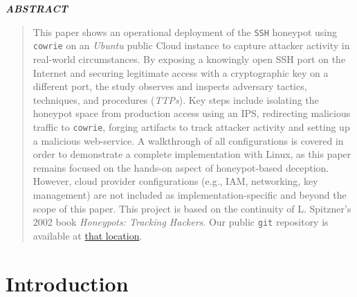 \documentclass{cls/ULBreport}
\renewenvironment{abstract}{%
  \clearpage
  \thispagestyle{plain}
  \begin{center}
    \bfseries\itshape ABSTRACT
  \end{center}
  \vspace{0.5cm}
  \begin{quote}
    \itshape
    \justifying
}{%
  \end{quote}
  \clearpage
}
\begin{document}
    
    \renewcommand{\rmdefault}{cmr} %
    \renewcommand{\sfdefault}{cmss} %
    \renewcommand{\ttdefault}{cmtt} %
    
    \makeatletter
    \renewcommand{\reset@font}{\normalfont\@setfontsize\f@size{12}{14.4}}
    \makeatother
    \normalfont


    \begin{abstract}        
    This paper shows an operational deployment of the \texttt{SSH} honeypot using \texttt{cowrie} on an \textit{Ubuntu} public Cloud instance to capture attacker activity in real-world circumstances. By exposing a knowingly open SSH port on the Internet and securing legitimate access with a cryptographic key on a different port, the study observes and inspects adversary tactics, techniques, and procedures (\textit{TTPs}). Key steps include isolating the honeypot space from production access using an IPS, redirecting malicious traffic to \texttt{cowrie}, forging artifacts to track attacker activity and setting up a malicious web-service. A walkthrough of all configurations is covered in order to demonstrate a complete implementation with Linux, as this paper remains focused on the hands-on aspect of honeypot-based deception. However, cloud provider configurations (e.g., IAM, networking, key management) are not included as implementation-specific and beyond the scope of this paper. This project is based on the continuity of L. Spitzner's 2002 book \textit{Honeypots: Tracking Hackers}. Our public \texttt{git} repository is available at \href{https://github.com/nottoBD/netsec-cowrie-honey}{that location}.
    \end{abstract}
    \newpage


    \section{Introduction}
\end{document}
